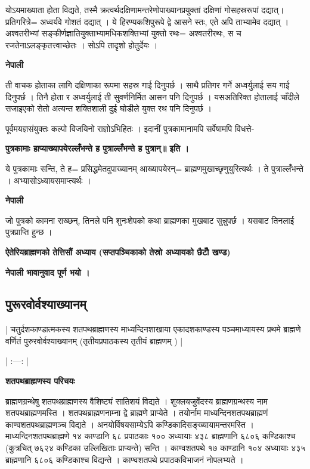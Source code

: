 \documentclass[11pt, a5paper]{article}
\begin{document}
योऽयमाख्याता होता विद्यते, तस्मै क्रत्वर्थदक्षिणामन्तरेणोपाख्यानप्रयुक्तां दक्षिणां गोसहस्ररूपां दद्यात्। प्रतिगरित्रे= अध्वर्यवे गोशतं दद्यात् । ये हिरण्यकशिपुरूपे द्वे आसने स्तः, एते अपि ताभ्यामेव दद्यात् । अश्वतरीभ्यां सङ्कीर्णज्ञातियुक्ताभ्यामधिकशक्तिभ्यां युक्तो रथः= अश्वतरीरथः, स च रजतेनाऽलङ्‌कृतत्त्वाच्छेतः । सोऽपि तादृशो होतुर्देयः ।

\textbf{नेपाली}

ती वाचक होताका लागि दक्षिणाका रूपमा सहस्र गाई दिनुपर्छ । साथै प्रतिगर गर्ने अध्वर्युलाई सय गाई दिनुपर्छ । तिनै होता र अध्वर्युलाई ती सुवर्णनिर्मित आसन पनि दिनुपर्छ । यसअतिरिक्त होतालाई चाँदीले सजाइएको सेतो अत्यन्त शक्तिशाली दुई घोडीले युक्त रथ पनि दिनुपर्छ ।

पूर्वमयज्ञसंयुक्तः कल्पो विजयिनो राज्ञोऽभिहितः । इदानीं पुत्रकामानामपि सर्वेषामपि विधत्ते-

\textbf{पुत्रकामाः हाप्याख्यापयेरल्लँभन्ते ह पुत्राल्लँभन्ते ह पुत्रान्॥ इति ।}

ये पुत्रकामाः सन्ति, ते  ह= प्रसिद्धमेतदुपाख्यानम् आख्यापयेरन्= ब्राह्मणमुखाच्छृणुयुरित्यर्थः । ते पुत्राल्लँभन्ते । अभ्यासोऽध्यायसमाप्त्यर्थः ।

\textbf{नेपाली}

जो पुत्रको कामना राख्छन्, तिनले पनि शुनःशेपको कथा ब्राह्मणका मुखबाट सुन्नुपर्छ । यसबाट तिनलाई पुत्रप्राप्ति हुन्छ ।

\textbf{ऐतेरियब्राह्मणको  तेत्तिसौं अध्याय (सप्तपञ्चिकाको तेस्रो अध्यायको छैटौँ खण्ड)}

\textbf{नेपाली भावानुवाद पूर्ण भयो ।}

\subsection{\textbf{पुरूरवोर्वश्याख्यानम्}}

| चतुर्दशकाण्डात्मकस्य शतपथब्राह्मणस्य माध्यन्दिनशाखाया एकादशकाण्डस्य  पञ्चमाध्यायस्य प्रथमे ब्राह्मणे वर्णितं पुरुरवोर्वश्याख्यानम्  (तृतीयप्रपाठकस्य तृतीयं ब्राह्मणम् ) |

| :---: |

\textbf{शतपथब्राह्मणस्य परिचयः}

ब्राह्मणग्रन्थेषु शतपथब्राह्मणस्य वैशिष्ट्यं सातिशयं विद्यते । शुक्लयजुर्वेदस्य ब्राह्मणग्रन्थस्य नाम शतपथब्राह्मणमस्ति । शतपथब्राह्मणनाम्ना द्वे ब्राह्मणे प्राप्येते । तयोर्नाम माध्यन्दिनशतपथब्राह्मणं काण्वशतपथब्राह्मणञ्च विद्यते । अनयोर्विषयसाम्येऽपि कण्डिकादिसङ्‌ख्यायामन्तरमस्ति । माध्यन्दिनशतपथब्राह्मणे १४ काण्डानि ६८ प्रपाठकाः १०० अध्यायाः ४३८ ब्राह्मणानि ६८०६ कण्डिकाश्च (कुत्रचित् ७६२४ कण्डिका उल्लिखिताः प्राप्यन्ते) सन्ति । काण्वशतपथे १७ काण्डानि १०४ अध्यायाः ४३५ ब्राह्मणानि ६८०६ कण्डिकाश्च विद्यन्ते । काण्वशतपथे प्रपाठकविभाजनं नोपलभ्यते ।
\end{document}
